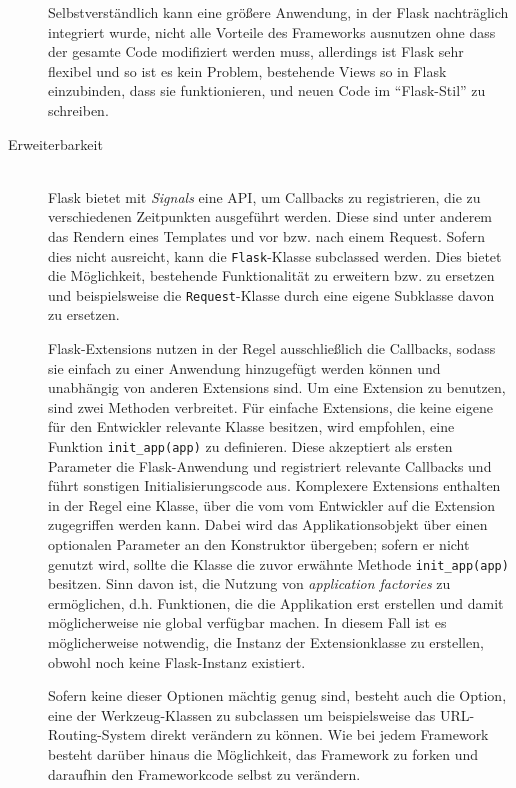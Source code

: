 \begin{description}
Selbstverständlich kann eine größere Anwendung, in der Flask nachträglich integriert wurde, nicht
alle Vorteile des Frameworks ausnutzen ohne dass der gesamte Code modifiziert werden muss,
allerdings ist Flask sehr flexibel und so ist es kein Problem, bestehende Views so in Flask
einzubinden, dass sie funktionieren, und neuen Code im \enquote{Flask-Stil} zu schreiben.


\item[Erweiterbarkeit] \hfill \\
Flask bietet mit \emph{Signals} eine API, um Callbacks zu registrieren, die zu verschiedenen
Zeitpunkten ausgeführt werden. Diese sind unter anderem das Rendern eines Templates und vor bzw.
nach einem Request. Sofern dies nicht ausreicht, kann die \lstinline{Flask}-Klasse subclassed
werden. Dies bietet die Möglichkeit, bestehende Funktionalität zu erweitern bzw. zu ersetzen und
beispielsweise die \lstinline{Request}-Klasse durch eine eigene Subklasse davon zu ersetzen.

Flask-Extensions nutzen in der Regel ausschließlich die Callbacks, sodass sie einfach zu einer
Anwendung hinzugefügt werden können und unabhängig von anderen Extensions sind. Um eine Extension zu
benutzen, sind zwei Methoden verbreitet. Für einfache Extensions, die keine eigene für den
Entwickler relevante Klasse besitzen, wird empfohlen, eine Funktion \lstinline{init_app(app)} zu
definieren. Diese akzeptiert als ersten Parameter die Flask-Anwendung und registriert relevante
Callbacks und führt sonstigen Initialisierungscode aus. Komplexere Extensions enthalten in der Regel
eine Klasse, über die vom vom Entwickler auf die Extension zugegriffen werden kann. Dabei wird das
Applikationsobjekt über einen optionalen Parameter an den Konstruktor übergeben; sofern er nicht
genutzt wird, sollte die Klasse die zuvor erwähnte Methode \lstinline{init_app(app)} besitzen. Sinn
davon ist, die Nutzung von \emph{application factories} zu ermöglichen, d.h. Funktionen, die die
Applikation erst erstellen und damit möglicherweise nie global verfügbar machen. In diesem Fall ist
es möglicherweise notwendig, die Instanz der Extensionklasse zu erstellen, obwohl noch keine
Flask-Instanz existiert.

Sofern keine dieser Optionen mächtig genug sind, besteht auch die Option, eine der Werkzeug-Klassen
zu subclassen um beispielsweise das URL-Routing-System direkt verändern zu können. Wie bei jedem
Framework besteht darüber hinaus die Möglichkeit, das Framework zu forken und daraufhin den
Frameworkcode selbst zu verändern.



\end{description}
